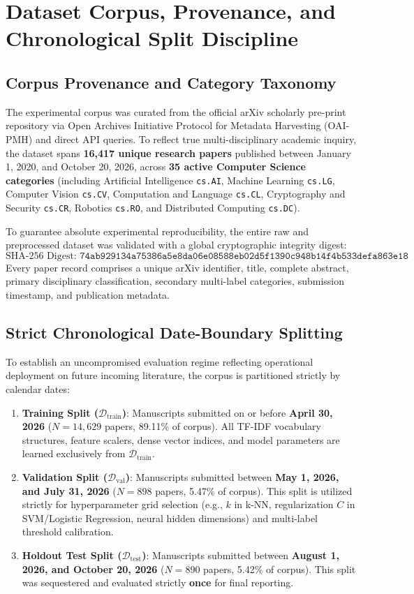 \documentclass[journal]{IEEEtran}
\begin{document}
\section{Dataset Corpus, Provenance, and Chronological Split Discipline}
\subsection{Corpus Provenance and Category Taxonomy}
The experimental corpus was curated from the official arXiv scholarly pre-print repository via Open Archives Initiative Protocol for Metadata Harvesting (OAI-PMH) and direct API queries. To reflect true multi-disciplinary academic inquiry, the dataset spans \textbf{16,417 unique research papers} published between January 1, 2020, and October 20, 2026, across \textbf{35 active Computer Science categories} (including Artificial Intelligence \texttt{cs.AI}, Machine Learning \texttt{cs.LG}, Computer Vision \texttt{cs.CV}, Computation and Language \texttt{cs.CL}, Cryptography and Security \texttt{cs.CR}, Robotics \texttt{cs.RO}, and Distributed Computing \texttt{cs.DC}).

To guarantee absolute experimental reproducibility, the entire raw and preprocessed dataset was validated with a global cryptographic integrity digest:
\begin{equation}
\text{SHA-256 Digest: } \texttt{74ab929134a75386a5e8da06e08588eb02d5f1390c948b14f4b533defa863e18}
\end{equation}
Every paper record comprises a unique arXiv identifier, title, complete abstract, primary disciplinary classification, secondary multi-label categories, submission timestamp, and publication metadata.

\subsection{Strict Chronological Date-Boundary Splitting}
To establish an uncompromised evaluation regime reflecting operational deployment on future incoming literature, the corpus is partitioned strictly by calendar dates:
\begin{enumerate}
    \item \textbf{Training Split ($\mathcal{D}_{\text{train}}$)}: Manuscripts submitted on or before \textbf{April 30, 2026} ($N = 14,629$ papers, 89.11\% of corpus). All TF-IDF vocabulary structures, feature scalers, dense vector indices, and model parameters are learned exclusively from $\mathcal{D}_{\text{train}}$.
    \item \textbf{Validation Split ($\mathcal{D}_{\text{val}}$)}: Manuscripts submitted between \textbf{May 1, 2026, and July 31, 2026} ($N = 898$ papers, 5.47\% of corpus). This split is utilized strictly for hyperparameter grid selection (e.g., $k$ in k-NN, regularization $C$ in SVM/Logistic Regression, neural hidden dimensions) and multi-label threshold calibration.
    \item \textbf{Holdout Test Split ($\mathcal{D}_{\text{test}}$)}: Manuscripts submitted between \textbf{August 1, 2026, and October 20, 2026} ($N = 890$ papers, 5.42\% of corpus). This split was sequestered and evaluated strictly \textbf{once} for final reporting.
\end{enumerate}
\end{document}

